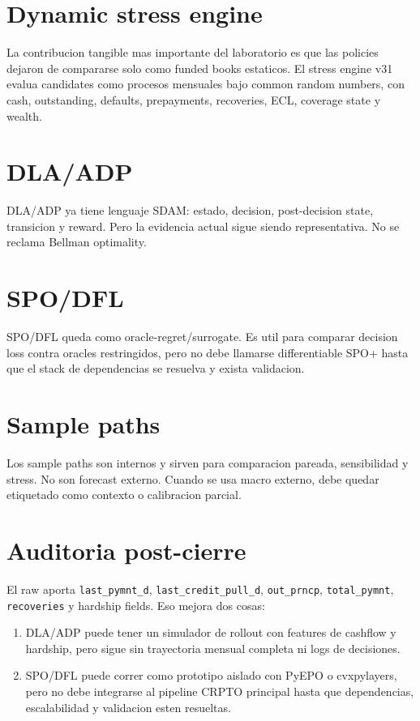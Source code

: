 \documentclass[
  spanish,
  11pt,
  letterpaper,
]{scrbook}
\providecommand{\tightlist}{%
  \setlength{\itemsep}{0pt}\setlength{\parskip}{0pt}}
\theoremstyle{plain}
\theoremstyle{remark}
\begin{document}
\section{Dynamic stress engine}\label{dynamic-stress-engine}

La contribucion tangible mas importante del laboratorio es que las
policies dejaron de compararse solo como funded books estaticos. El
stress engine v31 evalua candidates como procesos mensuales bajo common
random numbers, con cash, outstanding, defaults, prepayments,
recoveries, ECL, coverage state y wealth.

\section{DLA/ADP}\label{dlaadp}

DLA/ADP ya tiene lenguaje SDAM: estado, decision, post-decision state,
transicion y reward. Pero la evidencia actual sigue siendo
representativa. No se reclama Bellman optimality.

\section{SPO/DFL}\label{spodfl}

SPO/DFL queda como oracle-regret/surrogate. Es util para comparar
decision loss contra oracles restringidos, pero no debe llamarse
differentiable SPO+ hasta que el stack de dependencias se resuelva y
exista validacion.

\section{Sample paths}\label{sample-paths}

Los sample paths son internos y sirven para comparacion pareada,
sensibilidad y stress. No son forecast externo. Cuando se usa macro
externo, debe quedar etiquetado como contexto o calibracion parcial.

\section{Auditoria post-cierre}\label{auditoria-post-cierre-1}

El raw aporta \texttt{last\_pymnt\_d}, \texttt{last\_credit\_pull\_d},
\texttt{out\_prncp}, \texttt{total\_pymnt}, \texttt{recoveries} y
hardship fields. Eso mejora dos cosas:

\begin{enumerate}
\def\labelenumi{\arabic{enumi}.}
\tightlist
\item
  DLA/ADP puede tener un simulador de rollout con features de cashflow y
  hardship, pero sigue sin trayectoria mensual completa ni logs de
  decisiones.
\item
  SPO/DFL puede correr como prototipo aislado con PyEPO o cvxpylayers,
  pero no debe integrarse al pipeline CRPTO principal hasta que
  dependencias, escalabilidad y validacion esten resueltas.
\end{enumerate}
\end{document}
